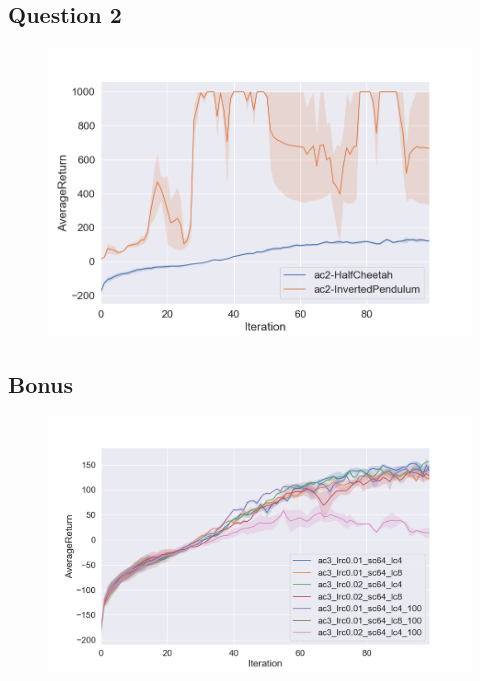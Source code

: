 \documentclass[a4paper]{article}
\begin{document}
\subsection*{Question 2}
\begin{figure}[H]
\centering
\includegraphics[width=1\textwidth]{p2q2.png}
\end{figure}

\subsection*{Bonus}
\begin{figure}[H]
\centering
\includegraphics[width=1\textwidth]{p2q3.png}
\end{figure}
\end{document}
